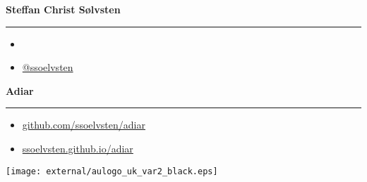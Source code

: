 \begin{frame}
  {\Large \textbf{Steffan Christ Sølvsten}}
  \vspace{1pt} {\hrule width0.45\linewidth}

  \vspace{5pt}

  \begin{itemize}
  \item[\faIcon{envelope}] 
  \item[\faIcon{twitter}] \href{https://www.twitter.com/ssoelvsten}{@ssoelvsten}
  \end{itemize}

  \vspace{10pt}

  {\Large \textbf{Adiar}}
  \vspace{1pt} {\hrule width0.45\linewidth}

  \vspace{5pt}

  \begin{itemize}
  \item[\faIcon{code}]
    \href{http://github.com/ssoelvsten/adiar}{github.com/ssoelvsten/adiar}
  \item[\faIcon{book}\hspace{2pt}]
    \href{http://ssoelvsten.github.io/adiar}{ssoelvsten.github.io/adiar}
  \end{itemize}


  \vspace{10pt}

  \texttt{[image: external/aulogo\_uk\_var2\_black.eps]}
\end{frame}